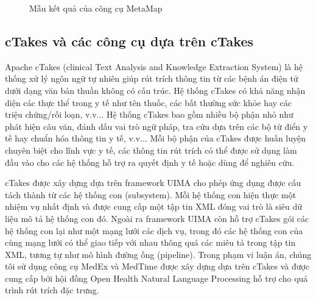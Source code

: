 \begin{figure}[ht]
\centering

\caption{Mẫu kết quả của công cụ MetaMap\label{metamapoutput}}
\end{figure}

\subsection*{cTakes và các công cụ dựa trên cTakes}
Apache cTakes (clinical Text Analysis and Knowledge Extraction System) là hệ thống xử lý ngôn ngữ tự nhiên giúp rút trích thông tin từ các bệnh án điện tử dưới dạng văn bản thuần không có cấu trúc. Hệ thống cTakes có khả năng nhận diện các thực thể trong y tế như tên thuốc, các bất thường sức khỏe hay các triệu chứng/rối loạn, v.v... Hệ thống cTakes bao gồm nhiều bộ phận nhỏ như phát hiện câu văn, đánh dấu vai trò ngữ pháp, tra cứu dựa trên các bộ từ điển y tế hay chuẩn hóa thông tin y tế, v.v... Mỗi bộ phận của cTakes được huấn luyện chuyên biệt cho lĩnh vực y tế, các thông tin rút trích có thể được sử dụng làm đầu vào cho các hệ thống hỗ trợ ra quyết định y tế hoặc dùng để nghiên cứu.


cTakes được xây dựng dựa trên framework UIMA cho phép ứng dụng được cấu tách thành từ các hệ thống con (subsystem). Mỗi hệ thống con hiện thực một nhiệm vụ nhất định và được cung cấp một tập tin XML đóng vai trò là siêu dữ liệu mô tả hệ thống con đó. Ngoài ra framework UIMA còn hỗ trợ cTakes gói các hệ thống con lại như một mạng lưới các dịch vụ, trong đó các hệ thống con của cùng mạng lưới có thể giao tiếp với nhau thông quá các miêu tả trong tập tin XML, tương tự như mô hình đường ống (pipeline). Trong phạm vi luận án, chúng tôi sử dụng công cụ MedEx \cite{HuaXu2009} và MedTime \cite{Sohn2013} được xây dựng dựa trên cTakes và được cung cấp bởi hội đồng Open Health Natural Language Processing hỗ trợ cho quá trình rút trích đặc trưng.

